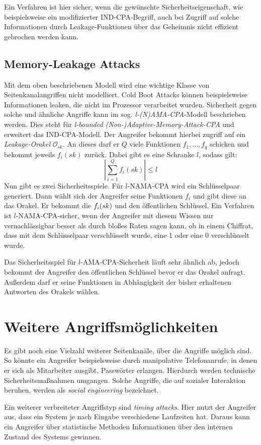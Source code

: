 Ein Verfahren ist hier sicher, wenn die gewünschte
Sicherheitseigenschaft, wie beispielsweise ein modifizierter
IND-CPA-Begriff, auch bei Zugriff auf solche Informationen durch
Leakage-Funktionen über das Geheimnis nicht effizient gebrochen werden kann.
\subsection{Memory-Leakage Attacks}
Mit dem oben beschriebenen Modell wird eine wichtige Klasse von
Seitenkanalangriffen nicht modelliert. Cold Boot Attacks können
beispielsweise Informationen leaken, die nicht im Prozessor verarbeitet
wurden. Sicherheit gegen solche und ähnliche Angriffe kann im
sog. \emph{l-(N)AMA-CPA}-Modell beschrieben werden. Dies steht für
\emph{l-bounded (Non-)Adaptive-Memory-Attack-CPA} und erweitert das
IND-CPA-Modell. Der Angreifer bekommt hierbei zugriff auf ein
\emph{Leakage-Orakel} $\mathcal{O}_{sk}$. An dieses darf er $Q$ viele
Funktionen $f_1, \dots, f_q$ schicken und bekommt jeweils $f_i(sk)$
zurück. Dabei gibt es eine Schranke $l$, sodass gilt:
\[
|\sum_{i=1}^Q f_i(sk)|\leq l
\]
Nun gibt es zwei Sicherheitsspiele. Für $l$-NAMA-CPA wird ein
Schlüsselpaar generiert. Dann wählt sich der Angreifer seine Funktionen
$f_i$ und gibt diese an das Orakel. Er bekommt die $f_i(sk)$ und den
öffentlichen Schlüssel. Ein Verfahren ist $l$-NAMA-CPA-sicher, wenn der
Angreifer mit diesem Wissen nur vernachlässigbar besser als durch bloßes
Raten sagen kann, ob in einem Chiffrat, dass mit dem Schlüsselpaar
verschlüsselt wurde, eine 1 oder eine 0 verschlüsselt wurde.

Das Sicherheitsspiel für $l$-AMA-CPA-Sicherheit läuft sehr ähnlich ab,
jedoch bekommt der Angreifer den öffentlichen Schlüssel bevor er das
Orakel anfragt. Außerdem darf er seine Funktionen in Abhängigkeit der
bisher erhaltenen Antworten des Orakels wählen.


\section{Weitere Angriffsmöglichkeiten}
Es gibt noch eine Vielzahl weiterer Seitenkanäle, über die Angriffe
möglich sind. So könnte ein Angreifer beispielsweise durch manipulative
Telefonanrufe, in denen er sich als Mitarbeiter ausgibt, Passwörter
erlangen. Hierdurch werden technische Sicherheitsmaßnahmen
umgangen. Solche Angriffe, die auf sozialer Interaktion beruhen, werden
als \emph{social engineering} bezeichnet.

Ein weiterer verbreiteter Angriffstyp sind \emph{timing attacks}. Hier
nutzt der Angreifer aus, dass ein System je nach Eingabe verschiedene
Laufzeiten hat. Daraus kann ein Angreifer über statistische Methoden
Informationen über den internen Zustand des Systems gewinnen.

